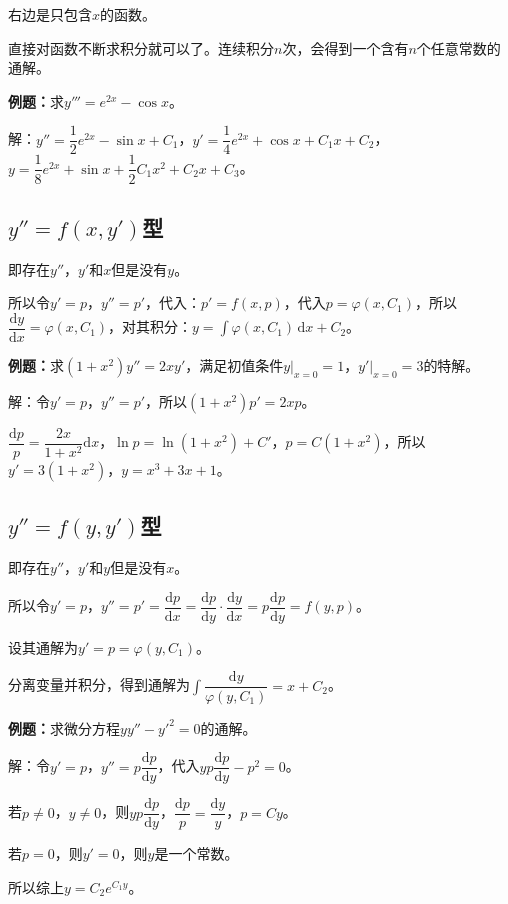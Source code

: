 \documentclass[UTF8, 12pt]{ctexart}
\begin{document}
右边是只包含$x$的函数。

直接对函数不断求积分就可以了。连续积分$n$次，会得到一个含有$n$个任意常数的通解。

\textbf{例题：}求$y'''=e^{2x}-\cos x$。

解：$y''=\dfrac{1}{2}e^{2x}-\sin x+C_1$，$y'=\dfrac{1}{4}e^{2x}+\cos x+C_1x+C_2$，$y=\dfrac{1}{8}e^{2x}+\sin x+\dfrac{1}{2}C_1x^2+C_2x+C_3$。

\subsection{\texorpdfstring{$y''=f(x,y')$}\ 型}

即存在$y''$，$y'$和$x$但是没有$y$。

所以令$y'=p$，$y''=p'$，代入：$p'=f(x,p)$，代入$p=\varphi(x,C_1)$，所以$\dfrac{\textrm{d}y}{\textrm{d}x}=\varphi(x,C_1)$，对其积分：$y=\int\varphi(x,C_1)\,\textrm{d}x+C_2$。

\textbf{例题：}求$(1+x^2)y''=2xy'$，满足初值条件$y\vert_{x=0}=1$，$y'\vert_{x=0}=3$的特解。

解：令$y'=p$，$y''=p'$，所以$(1+x^2)p'=2xp$。

$\dfrac{\textrm{d}p}{p}=\dfrac{2x}{1+x^2}\textrm{d}x$，$\ln p=\ln(1+x^2)+C'$，$p=C(1+x^2)$，所以$y'=3(1+x^2)$，$y=x^3+3x+1$。

\subsection{\texorpdfstring{$y''=f(y,y')$}\ 型}

即存在$y''$，$y'$和$y$但是没有$x$。

所以令$y'=p$，$y''=p'=\dfrac{\textrm{d}p}{\textrm{d}x}=\dfrac{\textrm{d}p}{\textrm{d}y}\cdot\dfrac{\textrm{d}y}{\textrm{d}x}=p\dfrac{\textrm{d}p}{\textrm{d}y}=f(y,p)$。

设其通解为$y'=p=\varphi(y,C_1)$。

分离变量并积分，得到通解为$\displaystyle{\int\dfrac{\textrm{d}y}{\varphi(y,C_1)}=x+C_2}$。

\textbf{例题：}求微分方程$yy''-y'^2=0$的通解。

解：令$y'=p$，$y''=p\dfrac{\textrm{d}p}{\textrm{d}y}$，代入$yp\dfrac{\textrm{d}p}{\textrm{d}y}-p^2=0$。

若$p\neq0$，$y\neq0$，则$yp\dfrac{\textrm{d}p}{\textrm{d}y}$，$\dfrac{\textrm{d}p}{p}=\dfrac{\textrm{d}y}{y}$，$p=Cy$。

若$p=0$，则$y'=0$，则$y$是一个常数。

所以综上$y=C_2e^{C_1y}$。
\end{document}
